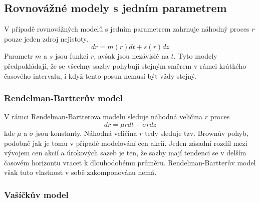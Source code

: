 \documentclass[a4paper]{book}
\begin{document}
\subsection{Rovnovážné modely s jedním parametrem}

V případě rovnovážných modelů s jedním parametrem zahrnuje náhodný proces $r$ pouze jeden zdroj nejistoty.
\begin{equation*}
dr = m(r)dt + s(r)dz
\end{equation*}
Parametr $m$ a $s$ jsou funkcí $r$, avšak jsou nezávislé na $t$. Tyto modely předpokládají, že se všechny sazby pohybují stejným směrem v rámci krátkého časového intervalu, i když tento posun nemusí být vždy stejný.

\subsubsection{Rendelman-Bartterův model}

V rámci Rendelman-Bartterova modelu sleduje náhodná veličina $r$ proces
\begin{equation*}
dr = \mu r dt + \sigma r dz
\end{equation*}
kde $\mu$ a $\sigma$ jsou konstanty. Náhodná veličina $r$ tedy sleduje tzv. Brownův pohyb, podobně jak je tomu v případě modelování cen akcií. Jeden zásadní rozdíl mezi vývojem cen akcií a úrokových sazeb je ten, že sazby mají tendenci se v delším časovém horizontu vracet k dlouhodobému průměru. Rendelman-Bartterův model však tuto vlastnost v sobě zakomponovánu nemá.

\subsubsection{Vašíčkův model}
\end{document}
